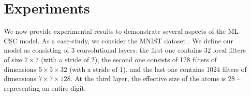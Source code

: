 \documentclass[10pt,journal]{IEEEtran}
\def\D{{\mathbf D}}
\def\gama{{\boldsymbol \gamma}}
\theoremstyle{plain}
\theoremstyle{definition}
\begin{document}





\section{Experiments}
\label{sec:experiments}
We now provide experimental results to demonstrate several aspects of the ML-CSC model. As a case-study, we consider the MNIST dataset \cite{MNIST}. We define our model as consisting of 3 convolutional layers: the first one contains 32 local filters of size $7\times 7$ (with a stride of 2), the second one consists of 128 filters of dimensions $5\times5\times32$ (with a stride of 1), and the last one contains 1024 filters of dimensions $7\times7\times128$. At the third layer, the effective size of the atoms is 28 -- representing an entire digit. 
\end{document}
